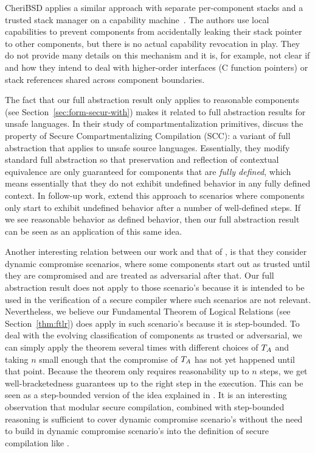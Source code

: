 \documentclass{jfp}
\begin{document}
CheriBSD applies a similar approach with separate per-component stacks and a trusted stack manager on a capability machine~\cite{watson_cheri_2015}.
The authors use local capabilities to prevent components from accidentally leaking their stack pointer to other components, but there is no actual capability revocation in play.
They do not provide many details on this mechanism and it is, for example, not clear if and how they intend to deal with higher-order interfaces (C function pointers) or stack references shared across component boundaries. 

The fact that our full abstraction result only applies to reasonable components (see Section~\ref{sec:form-secur-with}) makes it related to full abstraction results for unsafe languages.
In their study of compartmentalization primitives,  discuss the property of Secure Compartmentalizing Compilation (SCC): a variant of full abstraction that applies to unsafe source languages.
Essentially, they modify standard full abstraction so that preservation and reflection of contextual equivalence are only guaranteed for components that are {\itshape fully defined}, which means essentially that they do not exhibit undefined behavior in any fully defined context.
In follow-up work, \citet{Abate:2018:GCG:3243734.3243745} extend this approach to scenarios where components only start to exhibit undefined behavior after a number of well-defined steps. 
If we see reasonable behavior as defined behavior, then our full abstraction result can be seen as an application of this same idea.

Another interesting relation between our work and that of \citet{Abate:2018:GCG:3243734.3243745}, is that they consider dynamic compromise scenarios, where some components start out as trusted until they are compromised and are treated as adversarial after that.
Our full abstraction result does not apply to those scenario's because it is intended to be used in the verification of a secure compiler where such scenarios are not relevant.
Nevertheless, we believe our Fundamental Theorem of Logical Relations (see Section~\ref{thm:ftlr}) does apply in such scenario's because it is step-bounded.
To deal with the evolving classification of components as trusted or adversarial, we can simply apply the theorem several times with different choices of $T_{A}$ and taking $n$ small enough that the compromise of $T_{A}$ has not yet happened until that point. 
Because the theorem only requires reasonability up to $n$ steps, we get well-bracketedness guarantees up to the right step in the execution.
This can be seen as a step-bounded version of the idea explained in \cite{patrignani_modular_2016}.
It is an interesting observation that modular secure compilation, combined with step-bounded reasoning is sufficient to cover dynamic compromise scenario's without the need to build in dynamic compromise scenario's into the definition of secure compilation like \citet{Abate:2018:GCG:3243734.3243745}.
\end{document}

